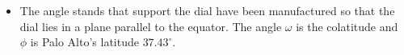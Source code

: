 \documentclass[final]{beamer}
\begin{document}
\begin{frame}
\begin{columns}[t]
\begin{column}[t]{0.24 \textwidth}
\begin{itemize}
\begin{center}
\end{center}


\item  The angle stands that support the dial have been manufactured so that
the dial lies in a plane parallel to the equator.  The angle $\omega$ is 
the colatitude and $\phi$ is Palo Alto's latitude $37.43 ^\circ$.
\begin{center}
\end{center}


\end{itemize}
\end{column}
\end{columns}
\end{frame}
\end{document}
